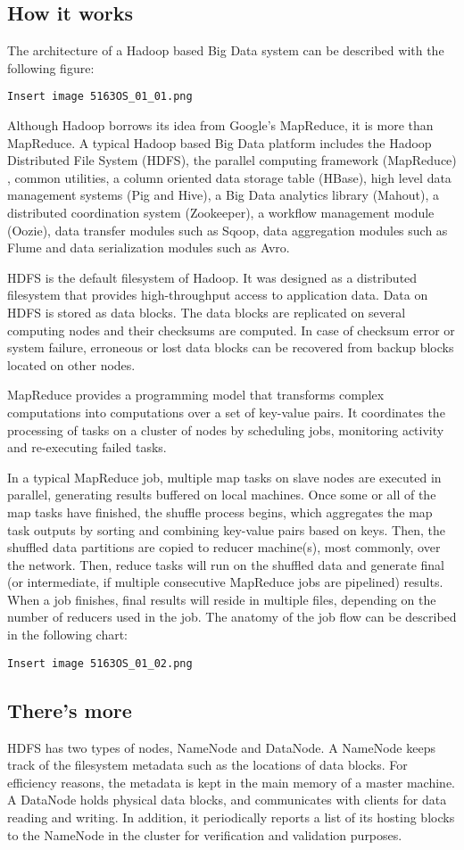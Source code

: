 \subsection*{How it works}
The architecture of a Hadoop based Big Data system can be described with the following figure:

\verb|Insert image 5163OS_01_01.png|

Although Hadoop borrows its idea from Google's MapReduce, it is more than MapReduce. A typical Hadoop based Big Data platform includes the Hadoop Distributed File System (HDFS), the parallel computing framework (MapReduce) , common utilities, a column oriented data storage table (HBase), high level data management systems (Pig and Hive), a Big Data analytics library (Mahout), a distributed coordination system (Zookeeper), a workflow management module (Oozie), data transfer modules such as Sqoop, data aggregation modules such as Flume and data serialization modules such as Avro.

HDFS is the default filesystem of Hadoop. It was designed as a distributed filesystem that provides high-throughput access to application data. Data on HDFS is stored as data blocks. The data blocks are replicated on several computing nodes and their checksums are computed. In case of checksum error or system failure, erroneous or lost data blocks can be recovered from backup blocks located on other nodes.

MapReduce provides a programming model that transforms complex computations into computations over a set of key-value pairs. It coordinates the processing of tasks on a cluster of nodes by scheduling jobs, monitoring activity and re-executing failed tasks.

In a typical MapReduce job, multiple map tasks on slave nodes are executed in parallel, generating results buffered on local machines. Once some or all of the map tasks have finished, the shuffle process begins, which aggregates the map task outputs by sorting and combining key-value pairs based on keys. Then, the shuffled data partitions are copied to reducer machine(s), most commonly, over the network. Then, reduce tasks will run on the shuffled data and generate final (or intermediate, if multiple consecutive MapReduce jobs are pipelined) results. When a job finishes, final results will reside in multiple files, depending on the number of reducers used in the job. The anatomy of the job flow can be described in the following chart:

\verb|Insert image 5163OS_01_02.png|
\subsection*{There's more}
HDFS has two types of nodes, NameNode and DataNode. A NameNode keeps track of the filesystem metadata such as the locations of data blocks. For efficiency reasons, the metadata is kept in the main memory of a master machine. A DataNode holds physical data blocks, and communicates with clients for data reading and writing. In addition, it periodically reports a list of its hosting blocks to the NameNode in the cluster for verification and validation purposes.

